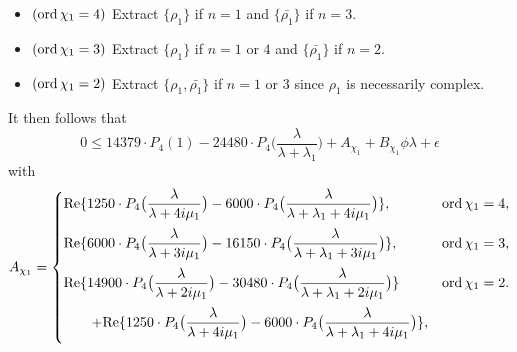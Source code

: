 \documentclass[12pt,psamsfonts]{amsart}
\theoremstyle{definition}
\theoremstyle{remark}
\numberwithin{equation}{section}
\begin{document}
\begin{itemize}
	\item $(\mathrm{ord}\, \chi_1 = 4)$ Extract $\{\rho_1\}$ if $n=1$ and $\{ \bar{\rho_1}\}$ if $n=3$. 	
	\item $(\mathrm{ord}\, \chi_1 = 3)$ Extract $\{\rho_1\}$ if $n=1$ or $4$ and $\{ \bar{\rho_1}\}$ if $n=2$.
	\item $(\mathrm{ord}\, \chi_1 = 2)$ Extract $\{\rho_1, \bar{\rho_1} \}$ if $n=1$ or $3$ since $\rho_1$ is necessarily complex.
\end{itemize}
It then follows that
\begin{equation} 
0 \leq 14379 \cdot P_4(1)  - 24480 \cdot P_4\big( \frac{\lambda}{\lambda+\lambda_1} \big) + A_{\chi_1} + B_{\chi_1}\phi \lambda + \epsilon
\label{ZFR-Poly-Identity}
\end{equation}
with
\[
A_{\chi_1} = \begin{cases}
\vspace*{2mm}
\ds \Re\{ 1250 \cdot P_4\big( \frac{\lambda}{\lambda+4i\mu_1} \big)  - 6000 \cdot P_4\big( \frac{\lambda}{\lambda+\lambda_1 + 4i\mu_1} \big) \}, & \ord \chi_1 = 4, \\
\vspace*{2mm}
\ds  \Re\{ 6000 \cdot P_4\big( \frac{\lambda}{\lambda+3i\mu_1} \big)   - 16150 \cdot P_4\big( \frac{\lambda}{\lambda+\lambda_1 + 3i\mu_1} \big)  \}, & \ord \chi_1 = 3, \\
\vspace*{2mm}
\ds \Re\{ 14900 \cdot P_4\big( \frac{\lambda}{\lambda+2i\mu_1} \big)  - 30480  \cdot P_4\big( \frac{\lambda}{\lambda+\lambda_1 + 2i\mu_1} \big)  \} & \ord \chi_1 = 2. \\ 
\vspace*{2mm}
\ds \qquad + \Re\{ 1250 \cdot P_4\big( \frac{\lambda}{\lambda+4i\mu_1} \big)   - 6000 \cdot P_4\big( \frac{\lambda}{\lambda+\lambda_1 + 4i\mu_1} \big)  \},
\end{cases}
\]
\end{document}
